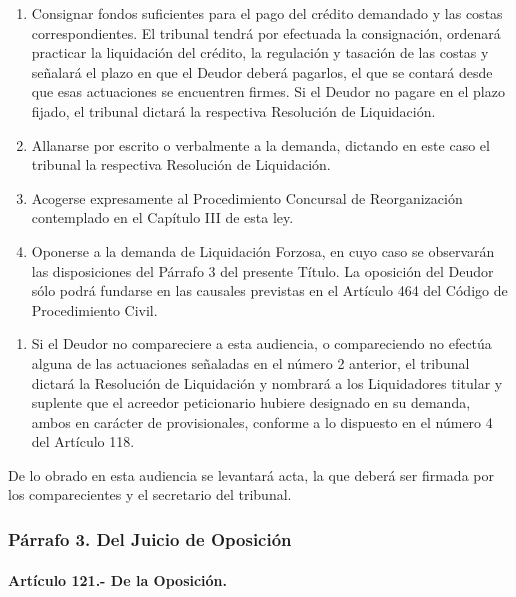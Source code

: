\documentclass[
]{book}
\providecommand{\tightlist}{%
  \setlength{\itemsep}{0pt}\setlength{\parskip}{0pt}}
\begin{document}
\begin{enumerate}
\def\labelenumi{\alph{enumi})}
\item
  Consignar fondos suficientes para el pago del crédito demandado y las costas correspondientes. El tribunal tendrá por efectuada la consignación, ordenará practicar la liquidación del crédito, la regulación y tasación de las costas y señalará el plazo en que el Deudor deberá pagarlos, el que se contará desde que esas actuaciones se encuentren firmes. Si el Deudor no pagare en el plazo fijado, el tribunal dictará la respectiva Resolución de Liquidación.
\item
  Allanarse por escrito o verbalmente a la demanda, dictando en este caso el tribunal la respectiva Resolución de Liquidación.
\item
  Acogerse expresamente al Procedimiento Concursal de Reorganización contemplado en el Capítulo III de esta ley.
\item
  Oponerse a la demanda de Liquidación Forzosa, en cuyo caso se observarán las disposiciones del Párrafo 3 del presente Título. La oposición del Deudor sólo podrá fundarse en las causales previstas en el Artículo 464 del Código de Procedimiento Civil.
\end{enumerate}

\begin{enumerate}
\def\labelenumi{\arabic{enumi})}
\setcounter{enumi}{2}
\tightlist
\item
  Si el Deudor no compareciere a esta audiencia, o compareciendo no efectúa alguna de las actuaciones señaladas en el número 2 anterior, el tribunal dictará la Resolución de Liquidación y nombrará a los Liquidadores titular y suplente que el acreedor peticionario hubiere designado en su demanda, ambos en carácter de provisionales, conforme a lo dispuesto en el número 4 del Artículo 118.
\end{enumerate}

De lo obrado en esta audiencia se levantará acta, la que deberá ser firmada por los comparecientes y el secretario del tribunal.

\hypertarget{puxe1rrafo-3.-del-juicio-de-oposiciuxf3n}{%
\subsubsection*{Párrafo 3. Del Juicio de Oposición}\label{puxe1rrafo-3.-del-juicio-de-oposiciuxf3n}}

\hypertarget{artuxedculo-121.--de-la-oposiciuxf3n.}{%
\paragraph*{Artículo 121.- De la Oposición.}\label{artuxedculo-121.--de-la-oposiciuxf3n.}}
\end{document}
